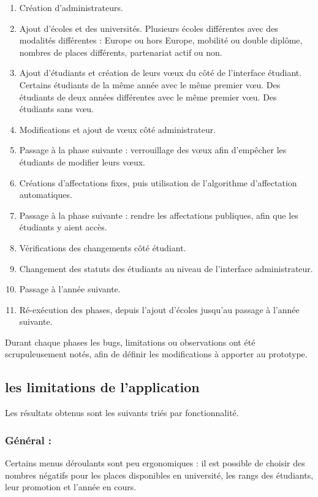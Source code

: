 \begin{enumerate}
\item Création d'administrateurs.
\item Ajout d'écoles et des universités. Plusieurs écoles différentes avec des modalités différentes : Europe ou hors Europe, mobilité ou double diplôme, nombres de places différents, partenariat actif ou non.
\item Ajout d'étudiants et création de leurs vœux du côté de l'interface étudiant. Certains étudiants de la même année avec le même premier vœu. Des étudiants de deux années différentes avec le même premier vœu. Des étudiants sans vœu.
\item Modifications et ajout de vœux côté administrateur.
\item Passage à la phase suivante : verrouillage des vœux afin d'empêcher les étudiants de modifier leurs vœux.
\item Créations d'affectations fixes, puis utilisation de l'algorithme d'affectation automatiques.
\item Passage à la phase suivante : rendre les affectations publiques, afin que les étudiants y aient accès.
\item Vérifications des changements côté étudiant.
\item Changement des statuts des étudiants au niveau de l'interface administrateur.
\item Passage à l'année suivante.
\item Ré-exécution des phases, depuis l'ajout d'écoles jusqu'au passage à l'année suivante.
\end{enumerate}


Durant chaque phases les bugs, limitations ou observations ont été scrupuleusement notés, afin de définir les modifications à apporter au prototype.


\subsection{les limitations de l'application}

Les résultats obtenus sont les suivants triés par fonctionnalité.

\subsubsection{Général :}
Certains menus déroulants sont peu ergonomiques : il est possible de choisir des nombres négatifs pour les places disponibles en université, les rangs des étudiants, leur promotion et l'année en cours.

